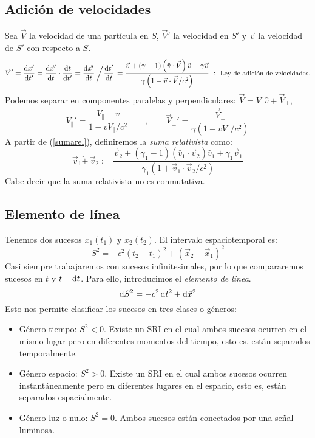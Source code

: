 \subsection{Adición de velocidades}
Sea $\vec{V}$ la velocidad de una partícula en $S$, $\vec{V}'$ la velocidad en $S'$ y $\vec{v}$ la velocidad de $S'$ con respecto a $S$. 
\begin{equation} \label{sumarel}
    \vec{V}' = \dv{\vec{x}'}{t'} = \dv{\vec{x}'}{t}\cdot \dv{t}{t'} =  \dv{\vec{x}'}{t}\left / \dv{t'}{t}\right . = \frac{\vec{v} + (\gamma -1)\left ( \hat{v}\cdot \vec{V} \right )\hat{v} - \gamma \vec{v}}{\gamma \left (1 - \vec{v}\cdot \vec{V}/c^2\right )} \ : \ \text{\small Ley de adición de velocidades.} 
\end{equation}
Podemos separar en componentes paralelas y perpendiculares: $\vec{V} = V_\parallel \hat{v} + \vec{V}_\perp $,
$$
V_\parallel ' = \frac{V_\parallel - v}{1-vV_\parallel /c^2} \qquad , \qquad \vec{V}_\perp ' = \frac{\vec{V}_\perp }{\gamma \left ( 1-vV_\parallel /c^2 \right )}
$$
A partir de (\ref{sumarel}), definiremos la \emph{suma relativista} como:
$$
\vec{v}_1 \breve{+}\, \vec{v}_2 := \frac{\vec{v}_2 + (\gamma_1 -1)(\hat{v}_1\cdot \vec{v}_2)\hat{v}_1 + \gamma _1\vec{v}_1}{\gamma_1 (1+\vec{v}_1\cdot \vec{v}_2/c^2)}
$$
Cabe decir que la suma relativista no es conmutativa.
\subsection{Elemento de línea}
Tenemos dos sucesos $x_1(t_1)$ y $x_2(t_2)$. El intervalo espaciotemporal es:
$$
S^2 = -c^2(t_2-t_1)^2 + (\vec{x}_2-\vec{x}_1)^2
$$
Casi siempre trabajaremos con sucesos infinitesimales, por lo que compararemos sucesos en $t$ y $t+\D{t}$. Para ello, introducimos el \emph{elemento de línea}.
\begin{equation} \label{ellin}
    \D{S}^2 = -c^2 \D{t}^2 + \D{\vec{x}}^2
\end{equation}
Esto nos permite clasificar los sucesos en tres clases o géneros:
\begin{itemize}
    \item Género tiempo: $S^2 < 0$. Existe un SRI en el cual ambos sucesos ocurren en el mismo lugar pero en diferentes momentos del tiempo, esto es, están separados temporalmente. 

    \item Género espacio: $S^2 > 0$. Existe un SRI en el cual ambos sucesos ocurren instantáneamente pero en diferentes lugares en el espacio, esto es, están separados espacialmente.

    \item Género luz o nulo: $S^2 = 0$. Ambos sucesos están conectados por una señal luminosa.
\end{itemize}

